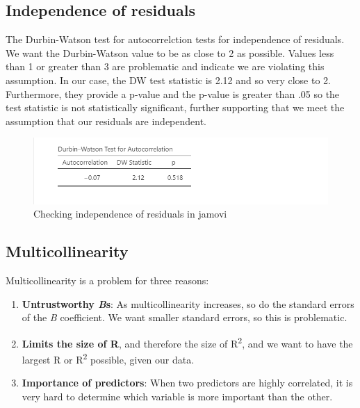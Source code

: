 \documentclass[
]{book}
\providecommand{\tightlist}{%
  \setlength{\itemsep}{0pt}\setlength{\parskip}{0pt}}
\begin{document}
\hypertarget{independence-of-residuals}{%
\subsection{Independence of residuals}\label{independence-of-residuals}}

The Durbin-Watson test for autocorrelction tests for independence of residuals. We want the Durbin-Watson value to be as close to 2 as possible. Values less than 1 or greater than 3 are problematic and indicate we are violating this assumption. In our case, the DW test statistic is 2.12 and so very close to 2. Furthermore, they provide a p-value and the p-value is greater than .05 so the test statistic is not statistically significant, further supporting that we meet the assumption that our residuals are independent.

\begin{figure}

{\centering \includegraphics[width=1\linewidth]{images/13-regression/regression-durbinwatson} 

}

\caption{Checking independence of residuals in jamovi}\label{fig:unnamed-chunk-9}
\end{figure}

\hypertarget{multicollinearity}{%
\subsection{Multicollinearity}\label{multicollinearity}}

Multicollinearity is a problem for three reasons:

\begin{enumerate}
\def\labelenumi{\arabic{enumi}.}
\tightlist
\item
  \textbf{Untrustworthy \emph{B}s}: As multicollinearity increases, so do the standard errors of the \emph{B} coefficient. We want smaller standard errors, so this is problematic.
\item
  \textbf{Limits the size of R}, and therefore the size of R\textsuperscript{2}, and we want to have the largest R or R\textsuperscript{2} possible, given our data.
\item
  \textbf{Importance of predictors}: When two predictors are highly correlated, it is very hard to determine which variable is more important than the other.
\end{enumerate}
\end{document}

